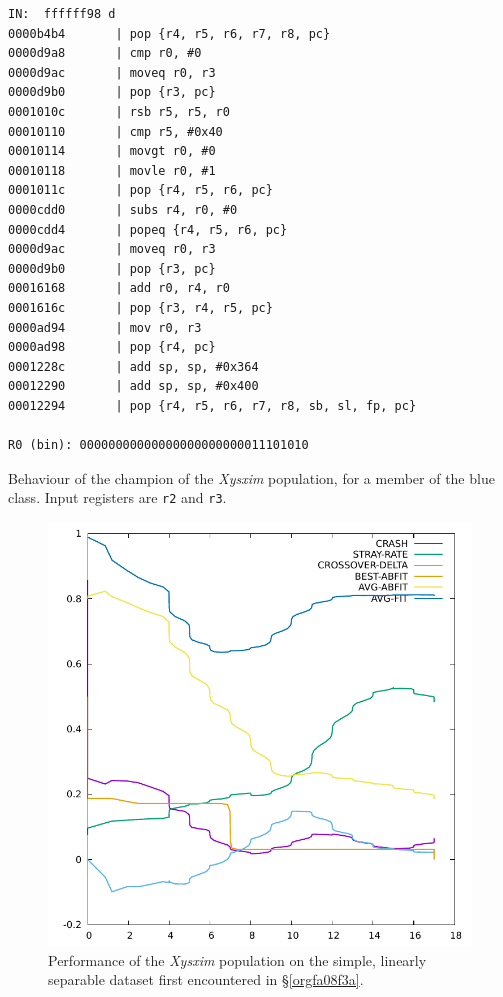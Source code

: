 \documentclass[12pt,glossary]{dalthesis}
\begin{document}
\begin{table}
\begin{lstlisting}
IN:  ffffff98 d
0000b4b4       | pop {r4, r5, r6, r7, r8, pc}
0000d9a8       | cmp r0, #0
0000d9ac       | moveq r0, r3
0000d9b0       | pop {r3, pc}
0001010c       | rsb r5, r5, r0
00010110       | cmp r5, #0x40
00010114       | movgt r0, #0
00010118       | movle r0, #1
0001011c       | pop {r4, r5, r6, pc}
0000cdd0       | subs r4, r0, #0
0000cdd4       | popeq {r4, r5, r6, pc}
0000d9ac       | moveq r0, r3
0000d9b0       | pop {r3, pc}
00016168       | add r0, r4, r0
0001616c       | pop {r3, r4, r5, pc}
0000ad94       | mov r0, r3
0000ad98       | pop {r4, pc}
0001228c       | add sp, sp, #0x364
00012290       | add sp, sp, #0x400
00012294       | pop {r4, r5, r6, r7, r8, sb, sl, fp, pc}

R0 (bin): 00000000000000000000000011101010
\end{lstlisting}
\caption{Behaviour of the champion of the \emph{Xysxim} population, for a member of the blue class. Input registers are \texttt{r2} and \texttt{r3}.}
\label{tab:xysxim-champ-blue}
\end{table}

\begin{figure}[htbp]
\centering
\includegraphics[width=.9\linewidth]{../images/plots/xysxim.pdf}
\caption{\label{fig:orgd221501}
Performance of the \emph{Xysxim} population on the simple, linearly separable dataset first encountered in \S \ref{orgfa08f3a}.}
\end{figure}
\end{document}
